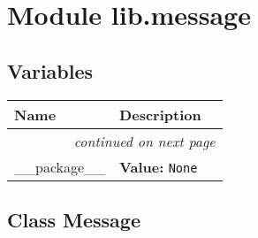 %
%
%


\section{Module lib.message}

    \label{lib:message}


  \subsection{Variables}

    \vspace{-1cm}
\hspace{\varindent}\begin{longtable}{|p{\varnamewidth}|p{\vardescrwidth}|l}
\cline{1-2}
\cline{1-2} \centering \textbf{Name} & \centering \textbf{Description}& \\
\cline{1-2}
\endhead\cline{1-2}\multicolumn{3}{r}{\small\textit{continued on next page}}\\\endfoot\cline{1-2}
\endlastfoot\raggedright \_\-\_\-p\-a\-c\-k\-a\-g\-e\-\_\-\_\- & \raggedright \textbf{Value:} 
{\tt None}&\\
\cline{1-2}
\end{longtable}



\subsection{Class Message}

